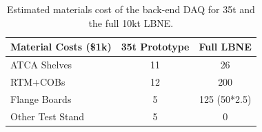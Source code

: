 \begin{table}[tbh]
\begin{center}
\begin{tabular}{|l|c|c|}   
\hline \hline 
Material Costs (\$1k)  & 35t  Prototype  &Full LBNE \\      
\hline
   ATCA Shelves          & 11&26 \\ 
   RTM+COBs              & 12& 200\\ 
   Flange Boards          &5& 125 (50*2.5)\\ 
   Other Test Stand                   &5     &  0 \\ 
\hline \hline
\end{tabular}
\caption[]{Estimated materials cost of the back-end DAQ for 35t and the full 10kt LBNE.}
\label{tab:labor} 
\end{center}
\end{table}

